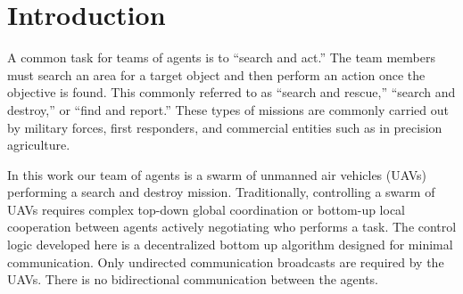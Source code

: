 \chapter{Introduction}
A common task for teams of agents is to ``search and act.''  The team members must search an area for a target object and then perform an action once the objective is found.  This commonly referred to as ``search and rescue,'' ``search and destroy,'' or ``find and report.''  These types of missions are commonly carried out by military forces, first responders, and commercial entities such as in precision agriculture.

In this work our team of agents is a swarm of unmanned air vehicles (UAVs) performing a search and destroy mission.  Traditionally, controlling a swarm of UAVs requires complex top-down global coordination or bottom-up local cooperation between agents actively negotiating who performs a task.  The control logic developed here is a decentralized bottom up algorithm designed for minimal communication.  Only undirected communication broadcasts are required by the UAVs.  There is no bidirectional communication between the agents.  


